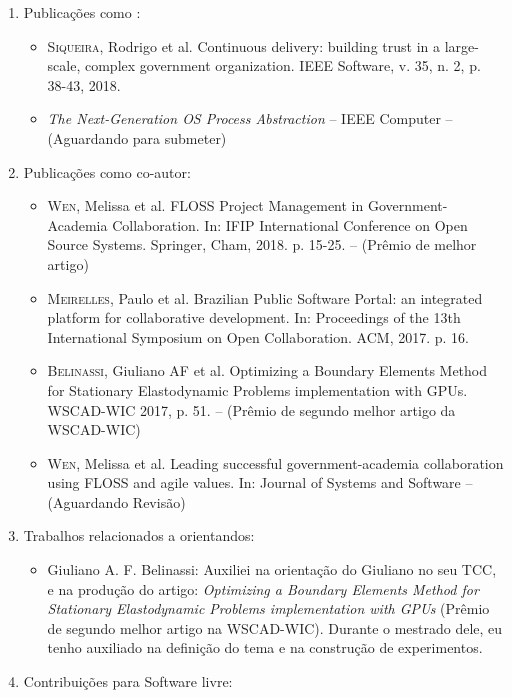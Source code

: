 \begin{enumerate}
  \item Publicações como :
    \begin{itemize}
      \item
      \textsc{Siqueira}, Rodrigo et al. Continuous delivery: building trust in a large-scale, complex government organization. IEEE Software, v. 35, n. 2, p. 38-43, 2018.
      \item \emph{The Next-Generation OS Process Abstraction} -- IEEE Computer -- (Aguardando para submeter)
    \end{itemize}

  \item Publicações como co-autor:
    \begin{itemize}
	\item
\textsc{Wen}, Melissa et al. FLOSS Project Management in Government-Academia Collaboration. In: IFIP International Conference on Open Source Systems. Springer, Cham, 2018. p. 15-25. -- (Prêmio de melhor artigo)
      \item 
\textsc{Meirelles}, Paulo et al. Brazilian Public Software Portal: an integrated platform for collaborative development. In: Proceedings of the 13th International Symposium on Open Collaboration. ACM, 2017. p. 16.
      \item
\textsc{Belinassi}, Giuliano AF et al. Optimizing a Boundary Elements Method for Stationary Elastodynamic Problems implementation with GPUs. WSCAD-WIC 2017, p. 51. -- (Prêmio de segundo melhor artigo da WSCAD-WIC)
      \item
\textsc{Wen}, Melissa et al. Leading successful government-academia collaboration using FLOSS and agile values. In: Journal of Systems and Software -- (Aguardando Revisão)
    \end{itemize}
  \item Trabalhos relacionados a orientandos:
    \begin{itemize}
      \item
Giuliano A. F. Belinassi: Auxiliei na orientação do Giuliano no seu TCC, e na
produção do artigo: \emph{Optimizing a Boundary Elements Method for Stationary
Elastodynamic Problems implementation with GPUs} (Prêmio de segundo melhor
artigo na WSCAD-WIC). Durante o mestrado dele, eu tenho auxiliado na definição
do tema e na construção de experimentos.
    \end{itemize}
  \item Contribuições para Software livre:

\end{enumerate}

